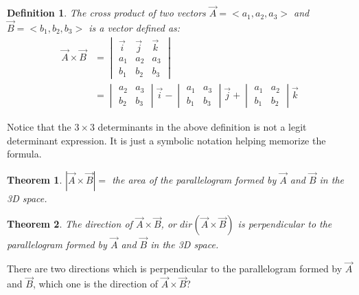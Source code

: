 \documentclass{article}
\newtheorem*{theorem}{Theorem}
\newtheorem*{definition}{Definition}
\begin{document}
\begin{definition}
  The cross product of two vectors $\vec{A} = <a_1, a_2, a_3>$ and
  $\vec{B} = <b_1, b_2, b_3>$ is a vector defined as:
  \[
    \begin{split}
    \vec{A} \times \vec{B} &= \begin{vmatrix}
                                \vec{i} & \vec{j} & \vec{k} \\
                                a_1 & a_2 & a_3 \\
                                b_1 & b_2 & b_3
                              \end{vmatrix} \\
                           &= \begin{vmatrix}
                                a_2 & a_3 \\
                                b_2 & b_3 
                              \end{vmatrix} \vec{i} -
                              \begin{vmatrix}
                                a_1 & a_3 \\
                                b_1 & b_3
                              \end{vmatrix} \vec{j} +
                              \begin{vmatrix}
                                a_1 & a_2 \\
                                b_1 & b_2
                              \end{vmatrix} \vec{k}
    \end{split}
  \]
\end{definition}

Notice that the $3 \times 3$ determinants in the above definition is not a
legit determinant expression. It is just a symbolic notation helping memorize
the formula.

\begin{theorem}
$|\vec{A} \times \vec{B}| = $ the area of the parallelogram formed by $\vec{A}$
and $\vec{B}$ in the 3D space.
\end{theorem}

\begin{theorem}
The direction of $\vec{A} \times \vec{B}$, or $dir(\vec{A} \times \vec{B})$
is perpendicular to the parallelogram formed by $\vec{A}$ and $\vec{B}$ in
the 3D space.
\end{theorem}

There are two directions which is perpendicular to the parallelogram formed by
$\vec{A}$ and $\vec{B}$, which one is the direction of $\vec{A} \times \vec{B}$?
\end{document}
